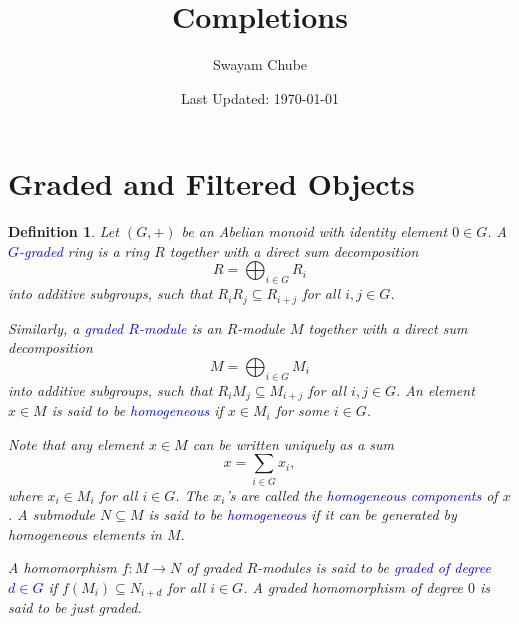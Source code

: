 \documentclass[11pt]{article}
\theoremstyle{thmstyle}
\theoremstyle{defstyle}
\newtheorem{definition}[theorem]{Definition}
\newcommand{\define}[1]{\textcolor{blue}{\textit{#1}}}
\begin{document}
\title{Completions}
\author{Swayam Chube}
\date{Last Updated: \today}

\maketitle

\section{Graded and Filtered Objects}

\begin{definition}
    Let $(G, +)$ be an Abelian monoid with identity element $0\in G$. A \define{$G$-graded} ring is a ring $R$ together with a direct sum decomposition 
    \begin{equation*}
        R = \bigoplus_{i\in G} R_i
    \end{equation*}
    into additive subgroups, such that $R_iR_j\subseteq R_{i + j}$ for all $i, j\in G$.

    Similarly, a \define{graded $R$-module} is an $R$-module $M$ together with a direct sum decomposition 
    \begin{equation*}
        M = \bigoplus_{i\in G} M_i
    \end{equation*}
    into additive subgroups, such that $R_i M_j\subseteq M_{i + j}$ for all $i,j\in G$. An element $x\in M$ is said to be \define{homogeneous} if $x\in M_i$ for some $i\in G$. 
    
    Note that any element $x\in M$ can be written uniquely as a sum 
    \begin{equation*}
        x = \sum_{i\in G} x_i,
    \end{equation*}
    where $x_i\in M_i$ for all $i\in G$. The $x_i$'s are called the \define{homogeneous components} of $x$.
    A submodule $N\subseteq M$ is said to be \define{homogeneous} if it can be generated by homogeneous elements in $M$.

    A homomorphism $f\colon M\to N$ of graded $R$-modules is said to be \define{graded of degree $d\in G$} if $f(M_i)\subseteq N_{i + d}$ for all $i\in G$. A graded homomorphism of degree $0$ is said to be just \emph{graded}.
\end{definition}
\end{document}
